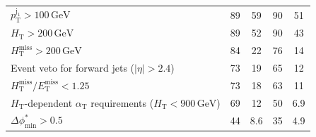 \begin{table}[H]
{\begin{tabular}{lcccc}
   $p_{\mathrm{T}}^{\mathrm{j_1}} > 100\,\mathrm{GeV}$ & \phantom{1}89\phantom{.1} & \phantom{1}59\phantom{.1} & \phantom{1}90\phantom{.1} & \phantom{1}51\phantom{.1} \\
   $H_{\mathrm{T}} > 200\,\mathrm{GeV}$  & \phantom{1}89\phantom{.1} & \phantom{1}52\phantom{.1} & \phantom{1}90\phantom{.1} & \phantom{1}43\phantom{.1} \\
   $H_{\mathrm{T}}^{\mathrm{miss}} > 200\,\mathrm{GeV}$  & \phantom{1}84\phantom{.1} & \phantom{1}22\phantom{.1} & \phantom{1}76\phantom{.1} & \phantom{1}14\phantom{.1} \\
  Event veto for forward jets ($|\eta| > 2.4$) & \phantom{1}73\phantom{.1} & \phantom{1}19\phantom{.1} & \phantom{1}65\phantom{.1} & \phantom{1}12\phantom{.1} \\
  $H_{\mathrm{T}}^{\mathrm{miss}} / E_{\mathrm{T}}^{\mathrm{miss}} < 1.25$ & \phantom{1}73\phantom{.1} & \phantom{1}18\phantom{.1} & \phantom{1}63\phantom{.1} & \phantom{1}11\phantom{.1} \\
  $H_{\mathrm{T}}$-dependent $\alpha_{\mathrm{T}}$ requirements ($H_{\mathrm{T}} < 900\,\mathrm{GeV}$)  &  \phantom{1}69\phantom{.1} & \phantom{1}12\phantom{.1} & \phantom{1}50\phantom{.1} & \phantom{10}6.9 \\
  $\Delta\phi^{*}_{\mathrm{min}} > 0.5$  & \phantom{1}44\phantom{.1} & \phantom{10}8.6 & \phantom{1}35\phantom{.1} & \phantom{10}4.9 \\
  \hline
\end{tabular}
}
\end{table}

